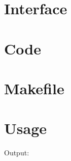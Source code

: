 \documentclass[12pt, a4paper]{article}
\begin{document}
\section{Interface}

\begin{scriptsize}
\begin{ttfamily}

\end{ttfamily}
\end{scriptsize}

\section{Code}

\begin{scriptsize}
\begin{ttfamily}

\end{ttfamily}
\end{scriptsize}

\section{Makefile}

\begin{scriptsize}
\begin{ttfamily}

\end{ttfamily}
\end{scriptsize}

\section{Usage}

\begin{scriptsize}
\begin{ttfamily}

\end{ttfamily}
\end{scriptsize}

Output:\\
\begin{scriptsize}
\begin{ttfamily}

\end{ttfamily}
\end{scriptsize}
\end{document}
